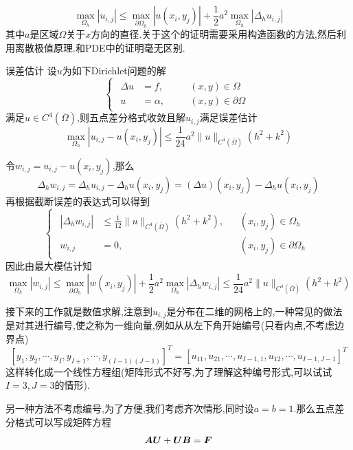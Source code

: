 $$
\max_{\Omega_h}|u_{i,j}|\leqslant \max_{\partial\Omega_h}|u(x_i,y_j)|+\frac{1}{2}a^2\max_{\Omega_h}|\Delta_h u_{i,j}|
$$
其中$a$是区域$\Omega$关于$x$方向的直径.关于这个的证明需要采用构造函数的方法,然后利用离散极值原理.和PDE中的证明毫无区别.\par
\begin{Theorem}{误差估计}
    设$u$为如下Dirichlet问题的解
    $$
    \begin{cases}
    \begin{alignedat}{2}
        \Delta u &= f,   \quad && (x, y) \in \Omega \\[3pt]
        u       &= \alpha,\quad && (x, y) \in \partial\Omega
    \end{alignedat}
\end{cases}
    $$
    满足$u\in C^4(\overline{\Omega})$,则五点差分格式收敛且解$u_{i,j}$满足误差估计
    $$
    \max_{\Omega_h}|u_{i,j}-u(x_i,y_j)|\leqslant \frac{1}{24}a^2\|u\|_{C^4(\overline{\Omega})}(h^2+k^2)
    $$
\end{Theorem}
\begin{Proof}
    令$w_{i,j}=u_{i,j}-u(x_i,y_j)$,那么
    $$
    \Delta_h w_{i,j} = \Delta_h u_{i,j} - \Delta_h u(x_i,y_j) = (\Delta u)(x_i,y_j) - \Delta_h u(x_i,y_j) 
    $$
    再根据截断误差的表达式可以得到
    $$
    \begin{cases}
        \begin{alignedat}{2}
            |\Delta_h w_{i,j}| &\leqslant \frac{1}{12}\|u\|_{C^4(\overline{\Omega})}(h^2 + k^2),&& (x_i,y_j)\in\Omega_h\\[3pt]
            w_{i,j} & = 0,&& (x_i,y_j)\in\partial\Omega_h
        \end{alignedat}
    \end{cases}
    $$
    因此由最大模估计知
    $$
    \max_{\Omega_h}|w_{i,j}|\leqslant \max_{\partial\Omega_h}|w(x_i,y_j)|+\frac{1}{2}a^2\max_{\Omega_h}|\Delta_h w_{i,j}|\leqslant \frac{1}{24}a^2\|u\|_{C^4(\overline{\Omega})}(h^2+k^2)
    $$
\end{Proof}
接下来的工作就是数值求解,注意到$u_{i,j}$是分布在二维的网格上的,一种常见的做法是对其进行编号,使之称为一维向量,例如从从左下角开始编号(只看内点,不考虑边界点)
$$
[y_1,y_2,\cdots,y_I,y_{I+1},\cdots,y_{(I-1)(J-1)}]^T=[u_{11},u_{21},\cdots,u_{I-1,1},u_{12},\cdots,u_{I-1,J-1}]^T
$$
这样转化成一个线性方程组(矩阵形式不好写,为了理解这种编号形式,可以试试$I=3,J=3$的情形).\par
另一种方法不考虑编号,为了方便,我们考虑齐次情形,同时设$a=b=1$.那么五点差分格式可以写成矩阵方程
\begin{equation}
    \bm{AU}+\bm{UB}=\bm{F}
    \label{eq:2.28}
\end{equation}
